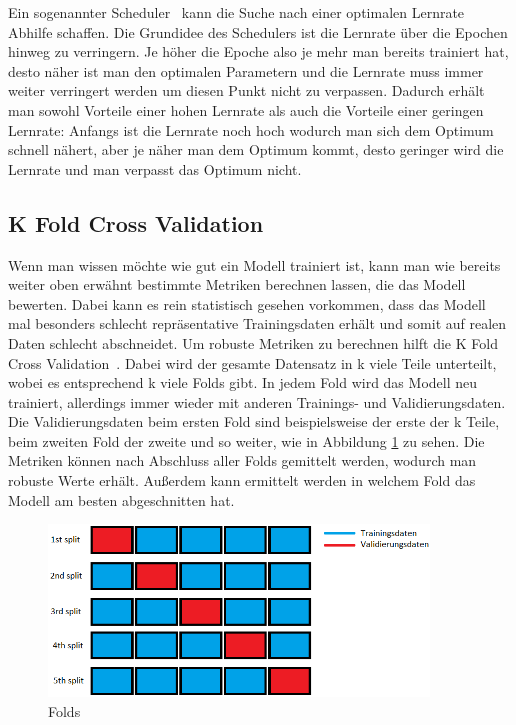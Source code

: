 \documentclass[12pt, a4paper]{article}
\begin{document}
Ein sogenannter Scheduler~\cite{o2} kann die Suche nach einer optimalen Lernrate Abhilfe schaffen. Die Grundidee des Schedulers ist die Lernrate über die Epochen hinweg zu verringern. Je höher die Epoche also je mehr man bereits trainiert hat, desto näher ist man den optimalen Parametern und die Lernrate muss immer weiter verringert werden um diesen Punkt nicht zu verpassen. Dadurch erhält man sowohl Vorteile einer hohen Lernrate als auch die Vorteile einer geringen Lernrate: Anfangs ist die Lernrate noch hoch wodurch man sich dem Optimum schnell nähert, aber je näher man dem Optimum kommt, desto geringer wird die Lernrate und man verpasst das Optimum nicht.

\subsection{K Fold Cross Validation}
Wenn man wissen möchte wie gut ein Modell trainiert ist, kann man wie bereits weiter oben erwähnt bestimmte Metriken berechnen lassen, die das Modell bewerten. Dabei kann es rein statistisch gesehen vorkommen, dass das Modell mal besonders schlecht repräsentative Trainingsdaten erhält und somit auf realen Daten schlecht abschneidet. Um robuste Metriken zu berechnen hilft die K Fold Cross Validation~\cite{o3}. Dabei wird der gesamte Datensatz in k viele Teile unterteilt, wobei es entsprechend k viele Folds gibt. In jedem Fold wird das Modell neu trainiert, allerdings immer wieder mit anderen Trainings- und Validierungsdaten. Die Validierungsdaten beim ersten Fold sind beispielsweise der erste der k Teile, beim zweiten Fold der zweite und so weiter, wie in Abbildung \ref{fig:folds} zu sehen. Die Metriken können nach Abschluss aller Folds gemittelt werden, wodurch man robuste Werte erhält. Außerdem kann ermittelt werden in welchem Fold das Modell am besten abgeschnitten hat.

\begin{figure}[t]
\centering
\includegraphics[width=0.9\textwidth]{folds.png}
\caption{Folds}
\label{fig:folds}
\end{figure}
\end{document}
